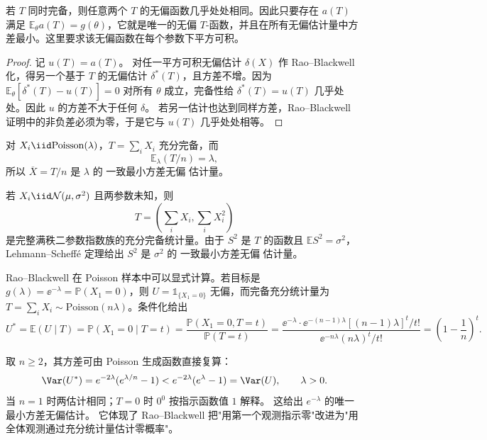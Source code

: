 \begin{theorem}
若 $T$ 同时完备，则任意两个 $T$ 的无偏函数几乎处处相同。因此只要存在 $a(T)$ 满足 $\mathbb E_\theta a(T)=g(\theta)$，它就是唯一的无偏 $T$-函数，并且在所有无偏估计量中方差最小。这里要求该无偏函数在每个参数下平方可积。
\end{theorem}

\begin{proof}
记 \(u(T)=a(T)\)。
对任一平方可积无偏估计 \(\delta(X)\) 作 Rao--Blackwell 化，得另一个基于 \(T\) 的无偏估计 \(\delta^*(T)\)，且方差不增。因为
\(\mathbb E_\theta[\delta^*(T)-u(T)]=0\) 对所有 \(\theta\) 成立，完备性给
\(\delta^*(T)=u(T)\) 几乎处处。因此 \(u\) 的方差不大于任何 \(\delta\)。
若另一估计也达到同样方差，Rao--Blackwell 证明中的非负差必须为零，于是它与 \(u(T)\) 几乎处处相等。
\end{proof}

\begin{exbox}
对 $X_i\iid\mathrm{Poisson}(\lambda)$，$T=\sum_iX_i$ 充分完备，而
\[
 \mathbb E_\lambda(T/n)=\lambda,
\]
所以 $\overline X=T/n$ 是 $\lambda$ 的 一致最小方差无偏 估计量。

若 $X_i\iid\mathcal N(\mu,\sigma^2)$ 且两参数未知，则
\[
 T=\left(\sum_iX_i,\sum_iX_i^2\right)
\]
是完整满秩二参数指数族的充分完备统计量。由于 $S^2$ 是 $T$ 的函数且 $\mathbb E S^2=\sigma^2$，Lehmann--Scheffé 定理给出 $S^2$ 是 $\sigma^2$ 的 一致最小方差无偏 估计量。
\end{exbox}

\begin{workedexample}[从单个零计数到全样本估计]
Rao--Blackwell 在 Poisson 样本中可以显式计算。若目标是 $g(\lambda)=\ee^{-\lambda}=\mathbb P(X_1=0)$，则 $U=\mathds{1}_{\{X_1=0\}}$ 无偏，而完备充分统计量为 $T=\sum_i X_i\sim\mathrm{Poisson}(n\lambda)$。条件化给出
\[
U^*=\mathbb E(U\mid T)=\mathbb P(X_1=0\mid T=t)
=\frac{\mathbb P(X_1=0,T=t)}{\mathbb P(T=t)}
=\frac{\ee^{-\lambda}\cdot\ee^{-(n-1)\lambda}[(n-1)\lambda]^t/t!}{\ee^{-n\lambda}(n\lambda)^t/t!}
=\left(1-\frac1n\right)^t.
\]

取 $n\ge2$，其方差可由 Poisson 生成函数直接复算：
\[
 \Var(U^*)=e^{-2\lambda}(e^{\lambda/n}-1)
 <e^{-2\lambda}(e^\lambda-1)=\Var(U),\qquad\lambda>0.
\]
当 $n=1$ 时两估计相同；$T=0$ 时 $0^0$ 按指示函数值 $1$ 解释。
这给出 $e^{-\lambda}$ 的唯一最小方差无偏估计。
它体现了 Rao--Blackwell 把"用第一个观测指示零"改进为"用全体观测通过充分统计量估计零概率"。
\end{workedexample}

